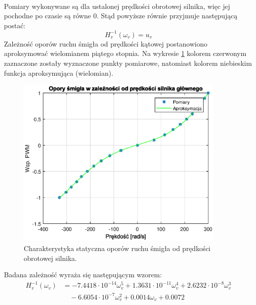 \documentclass[11pt,a4paper]{article}
\begin{document}
\paragraph*{}
Pomiary wykonywane są dla ustalonej prędkości obrotowej silnika, więc jej pochodne po czasie są równe \(0\). Stąd powyższe równie przyjmuje następującą postać:
\begin{equation}
H_v^{-1}(\omega_v) = u_v
\end{equation}
Zależność oporów ruchu śmigła od prędkości kątowej postanowiono aproksymować wielomianem piątego stopnia. Na wykresie \ref{fig:char_U_V} kolorem czerwonym zaznaczone zostały wyznaczone punkty pomiarowe, natomiast kolorem niebieskim funkcja aproksymująca (wielomian).

\begin{figure}[H]
	\centering
	\includegraphics[width=4in]{Figures/char_U_V.eps}
	\caption{Charakterystyka statyczna oporów ruchu śmigła od prędkości obrotowej silnika.}
	\label{fig:char_U_V}
\end{figure}

Badana zależność wyraża się następującym wzorem:
\begin{equation}
\begin{aligned}
H_v^{-1}(\omega_v) &= -7.4418\cdot 10^{-14}\omega_v^5+1.3631\cdot 10^{-11}\omega_v^4+2.6232\cdot 10^{-8}\omega_v^3\\ & \quad -6.6054\cdot 10^{-7}\omega_v^2+0.0014\omega_v+0.0072
\end{aligned}
\end{equation}
\end{document}
